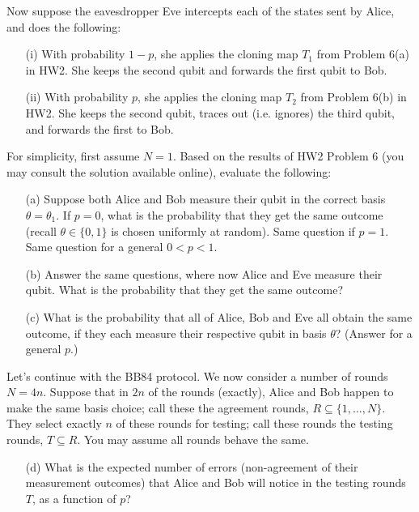 \documentclass[12pt]{article}
\begin{document}
\begin{enumerate}
Now suppose the eavesdropper Eve intercepts each of the states sent by Alice, and does the following: 
\begin{enumerate}
\item[(i)] With probability $1-p$, she applies the cloning map $T_1$ from Problem 6(a) in HW2. She keeps the second qubit and forwards the first qubit to Bob. 
\item[(ii)] With probability $p$, she applies the cloning map $T_2$ from Problem 6(b) in HW2. She keeps the second qubit, traces out (i.e. ignores) the third qubit, and forwards the first to Bob. 
\end{enumerate}
For simplicity, first assume $N=1$. Based on the results of HW2 Problem 6 (you may consult the solution available online), evaluate the following:
\begin{enumerate}
\item[(a)] Suppose both Alice and Bob measure their qubit in the correct basis $\theta=\theta_1$. If $p=0$, what is the probability that they get the same outcome (recall $\theta\in\{0,1\}$ is chosen uniformly at random). Same question if $p=1$. Same question for a general $0<p<1$. 
\item[(b)] Answer the same questions, where now Alice and Eve measure their qubit. What is the probability that they get the same outcome? 
\item[(c)] What is the probability that all of Alice, Bob and Eve all obtain the same outcome, if they each measure their respective qubit in basis $\theta$? (Answer for a general $p$.)
\end{enumerate}
Let's continue with the BB84 protocol. We now consider a number of rounds $N=4n$. Suppose that in $2n$ of the rounds (exactly), Alice and Bob happen to make the same basis choice; call these the agreement rounds, $R\subseteq\{1,\ldots,N\}$. They select exactly $n$ of these rounds for testing; call these rounds the testing rounds, $T \subseteq R$. You may assume all rounds behave the same. 
\begin{enumerate}
\item[(d)] What is the expected number of errors (non-agreement of their measurement outcomes) that Alice and Bob will notice in the testing rounds $T$, as a function of $p$?

\end{enumerate}
\end{enumerate}
\end{document}

